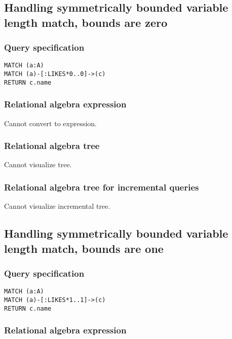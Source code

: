 \subsection{Handling symmetrically bounded variable length match, bounds are zero}

\subsubsection*{Query specification}

\begin{lstlisting}
MATCH (a:A)
MATCH (a)-[:LIKES*0..0]->(c)
RETURN c.name
\end{lstlisting}

\subsubsection*{Relational algebra expression}

Cannot convert to expression.

\subsubsection*{Relational algebra tree}

Cannot visualize tree.

\subsubsection*{Relational algebra tree for incremental queries}

Cannot visualize incremental tree.

\subsection{Handling symmetrically bounded variable length match, bounds are one}

\subsubsection*{Query specification}

\begin{lstlisting}
MATCH (a:A)
MATCH (a)-[:LIKES*1..1]->(c)
RETURN c.name
\end{lstlisting}

\subsubsection*{Relational algebra expression}

